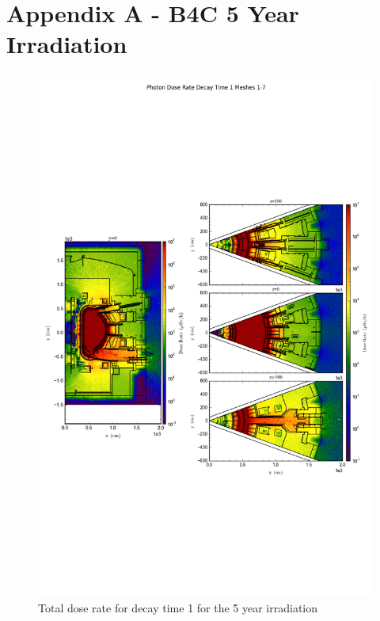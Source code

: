 \documentclass[12pt]{article}
\begin{document}
\section{Appendix A - B4C 5 Year Irradiation}
\begin{figure}[ht!]
\centering
\includegraphics[trim={0cm 8cm, 0cm 8cm},clip,scale=0.75]{../plots/final_model_with_b4c/5year/Photon_Dose_Rate_Decay_Time_1_Meshes_1-7.png}
\caption{Total dose rate for decay time 1 for the 5 year irradiation}
\label{fig:photons_5y_dc1_b4c_dose}
\end{figure}
\end{document}
